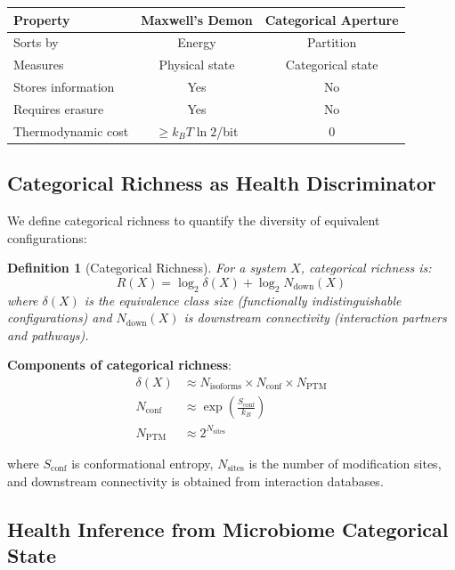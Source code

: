 \documentclass[twocolumn,10pt]{article}
\newtheorem{definition}[theorem]{Definition}
\begin{document}
\begin{center}
\begin{tabular}{lcc}
\toprule
Property & Maxwell's Demon & Categorical Aperture \\
\midrule
Sorts by & Energy & Partition \\
Measures & Physical state & Categorical state \\
Stores information & Yes & No \\
Requires erasure & Yes & No \\
Thermodynamic cost & $\geq k_B T \ln 2$/bit & 0 \\
\bottomrule
\end{tabular}
\end{center}

\subsection{Categorical Richness as Health Discriminator}

We define categorical richness to quantify the diversity of equivalent configurations:

\begin{definition}[Categorical Richness]
For a system $X$, categorical richness is:
\begin{equation}
    R(X) = \log_2 \delta(X) + \log_2 N_{\text{down}}(X)
    \label{eq:richness}
\end{equation}
where $\delta(X)$ is the equivalence class size (functionally indistinguishable configurations) and $N_{\text{down}}(X)$ is downstream connectivity (interaction partners and pathways).
\end{definition}

\textbf{Components of categorical richness}:
\begin{align}
    \delta(X) &\approx N_{\text{isoforms}} \times N_{\text{conf}} \times N_{\text{PTM}} \\
    N_{\text{conf}} &\approx \exp\left(\frac{S_{\text{conf}}}{k_B}\right) \\
    N_{\text{PTM}} &\approx 2^{N_{\text{sites}}}
\end{align}

where $S_{\text{conf}}$ is conformational entropy, $N_{\text{sites}}$ is the number of modification sites, and downstream connectivity is obtained from interaction databases.

\subsection{Health Inference from Microbiome Categorical State}
\end{document}
